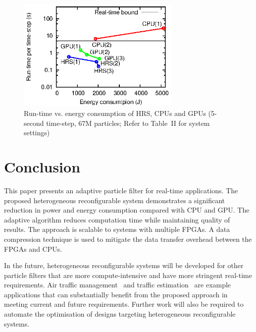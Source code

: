 \begin{figure}[t!]
\centering
\includegraphics[width=0.7\textwidth]{runtime_reconfiguration/figures/fig_scale}
\caption{Run-time vs. energy consumption of HRS, CPUs and GPUs (5-second time-step, 67M particles; Refer to Table~II for system settings)}
\label{fig:scale}
\end{figure}


\section{Conclusion}

This paper presents an adaptive particle filter for real-time applications.
The proposed heterogeneous reconfigurable system demonstrates a significant reduction in power and energy consumption compared with CPU and GPU.
The adaptive algorithm reduces computation time while maintaining quality of results. 
The approach is scalable to systems with multiple FPGAs.
A data compression technique is used to mitigate the data transfer overhead between the FPGAs and CPUs.

In the future, heterogeneous reconfigurable systems will be developed for other particle filters that are more compute-intensive and have more stringent real-time requirements.
Air traffic management~\cite{chau13b} and traffic estimation~\cite{mihaylova07} are example applications that can substantially benefit from the proposed approach in meeting current and future requirements.
Further work will also be required to automate the optimisation of designs targeting heterogeneous reconfigurable systems.



